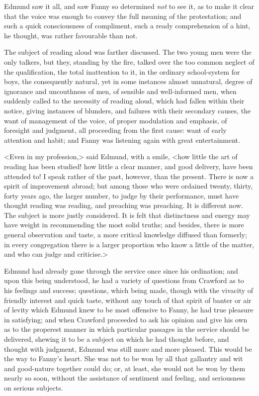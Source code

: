 Edmund saw it all, and saw Fanny so determined \textit{not}  to see it, as to make it clear that the voice was enough to convey the full meaning of the protestation; and such a quick consciousness of compliment, such a ready comprehension of a hint, he thought, was rather favourable than not.

The subject of reading aloud was farther discussed. The two young men were the only talkers, but they, standing by the fire, talked over the too common neglect of the qualification, the total inattention to it, in the ordinary school-system for boys, the consequently natural, yet in some instances almost unnatural, degree of ignorance and uncouthness of men, of sensible and well-informed men, when suddenly called to the necessity of reading aloud, which had fallen within their notice, giving instances of blunders, and failures with their secondary causes, the want of management of the voice, of proper modulation and emphasis, of foresight and judgment, all proceeding from the first cause: want of early attention and habit; and Fanny was listening again with great entertainment.

<Even in my profession,> said Edmund, with a smile, <how little the art of reading has been studied! how little a clear manner, and good delivery, have been attended to! I speak rather of the past, however, than the present. There is now a spirit of improvement abroad; but among those who were ordained twenty, thirty, forty years ago, the larger number, to judge by their performance, must have thought reading was reading, and preaching was preaching. It is different now. The subject is more justly considered. It is felt that distinctness and energy may have weight in recommending the most solid truths; and besides, there is more general observation and taste, a more critical knowledge diffused than formerly; in every congregation there is a larger proportion who know a little of the matter, and who can judge and criticise.>

Edmund had already gone through the service once since his ordination; and upon this being understood, he had a variety of questions from Crawford as to his feelings and success; questions, which being made, though with the vivacity of friendly interest and quick taste, without any touch of that spirit of banter or air of levity which Edmund knew to be most offensive to Fanny, he had true pleasure in satisfying; and when Crawford proceeded to ask his opinion and give his own as to the properest manner in which particular passages in the service should be delivered, shewing it to be a subject on which he had thought before, and thought with judgment, Edmund was still more and more pleased. This would be the way to Fanny's heart. She was not to be won by all that gallantry and wit and good-nature together could do; or, at least, she would not be won by them nearly so soon, without the assistance of sentiment and feeling, and seriousness on serious subjects.

